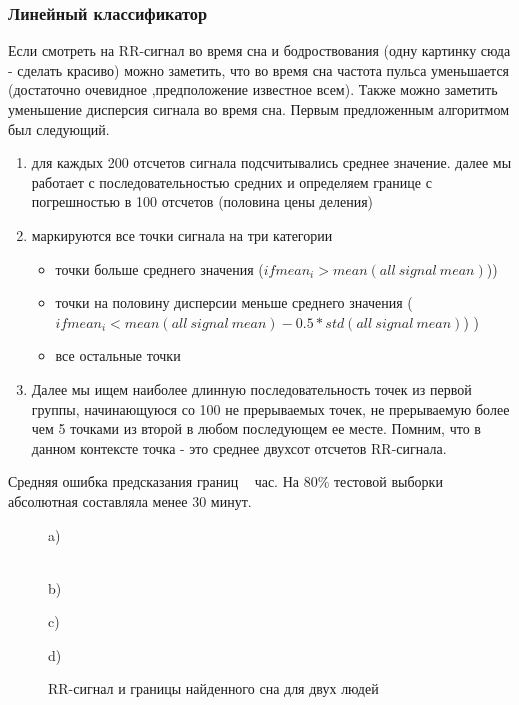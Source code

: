 \subsubsection{Линейный классификатор}
Если смотреть на RR-сигнал во время сна и бодроствования (одну картинку сюда - сделать красиво) можно заметить, что во время сна частота пульса уменьшается (достаточно очевидное ,предположение известное всем). Также можно заметить уменьшение дисперсия сигнала во время сна.
Первым предложенным алгоритмом был следующий.
\begin{enumerate}
	\item для каждых 200 отсчетов сигнала подсчитывались среднее значение. далее мы работает с последовательностью средних и определяем границе с погрешностью в 100 отсчетов (половина цены деления)
	\item маркируются все точки сигнала на три категории
	\begin{itemize}
		\item точки больше среднего значения ($if mean_i > mean(all\ signal\ mean)$))
		\item точки на половину дисперсии меньше среднего значения ($if mean_i < mean(all\ signal\ mean) - 0.5*std(all\ signal\ mean)$) )
		\item все остальные точки
	\end{itemize}
	\item Далее мы ищем наиболее длинную последовательность точек из первой группы, начинающуюся со 100 не прерываемых точек, не прерываемую более чем 5 точками из второй в любом последующем ее месте. Помним, что в данном контексте точка - это среднее двухсот отсчетов RR-сигнала.
\end{enumerate}
Средняя ошибка предсказания границ ~ час.
На 80\% тестовой выборки абсолютная составляла менее 30 минут.
\begin{figure}[h]
	\begin{minipage}[h]{0.47\linewidth}
		\center{\texttt{[image: 1104770]}} a) \\
	\end{minipage}
	\hfill
	\begin{minipage}[h]{0.47\linewidth}
		\center{\texttt{[image: 1105520]}} \\b)
	\end{minipage}
	\vfill
	\begin{minipage}[h]{0.47\linewidth}
		\center{\texttt{[image: 1104771]}} c) \\
	\end{minipage}
	\hfill
	\begin{minipage}[h]{0.47\linewidth}
		\center{\texttt{[image: 1105521]}} d) \\
	\end{minipage}
	\caption{RR-сигнал и границы найденного сна для двух людей}
	\label{ris:find_sleep_bound1}
\end{figure}
